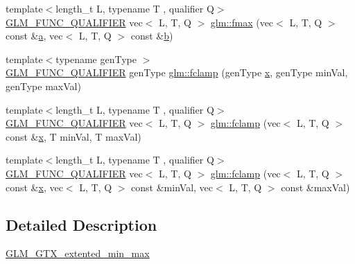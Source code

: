 \begin{DoxyCompactItemize}
\item 
{\footnotesize template$<$length\+\_\+t L, typename T , qualifier Q$>$ }\\\hyperlink{setup_8hpp_a33fdea6f91c5f834105f7415e2a64407}{G\+L\+M\+\_\+\+F\+U\+N\+C\+\_\+\+Q\+U\+A\+L\+I\+F\+I\+ER} vec$<$ L, T, Q $>$ \hyperlink{group__gtx__extended__min__max_ga538c9e7de1d0cb8157e548691487d32a}{glm\+::fmax} (vec$<$ L, T, Q $>$ const \&\hyperlink{_s_d_l__opengl__glext_8h_a3309789fc188587d666cda5ece79cf82}{a}, vec$<$ L, T, Q $>$ const \&\hyperlink{_s_d_l__opengl__glext_8h_a0f71581a41fd2264c8944126dabbd010}{b})
\item 
{\footnotesize template$<$typename gen\+Type $>$ }\\\hyperlink{setup_8hpp_a33fdea6f91c5f834105f7415e2a64407}{G\+L\+M\+\_\+\+F\+U\+N\+C\+\_\+\+Q\+U\+A\+L\+I\+F\+I\+ER} gen\+Type \hyperlink{group__gtx__extended__min__max_ga1e28539d3a46965ed9ef92ec7cb3b18a}{glm\+::fclamp} (gen\+Type \hyperlink{_s_d_l__opengl_8h_ad0e63d0edcdbd3d79554076bf309fd47}{x}, gen\+Type min\+Val, gen\+Type max\+Val)
\item 
{\footnotesize template$<$length\+\_\+t L, typename T , qualifier Q$>$ }\\\hyperlink{setup_8hpp_a33fdea6f91c5f834105f7415e2a64407}{G\+L\+M\+\_\+\+F\+U\+N\+C\+\_\+\+Q\+U\+A\+L\+I\+F\+I\+ER} vec$<$ L, T, Q $>$ \hyperlink{group__gtx__extended__min__max_ga60796d08903489ee185373593bc16b9d}{glm\+::fclamp} (vec$<$ L, T, Q $>$ const \&\hyperlink{_s_d_l__opengl_8h_ad0e63d0edcdbd3d79554076bf309fd47}{x}, T min\+Val, T max\+Val)
\item 
{\footnotesize template$<$length\+\_\+t L, typename T , qualifier Q$>$ }\\\hyperlink{setup_8hpp_a33fdea6f91c5f834105f7415e2a64407}{G\+L\+M\+\_\+\+F\+U\+N\+C\+\_\+\+Q\+U\+A\+L\+I\+F\+I\+ER} vec$<$ L, T, Q $>$ \hyperlink{group__gtx__extended__min__max_ga5c15fa4709763c269c86c0b8b3aa2297}{glm\+::fclamp} (vec$<$ L, T, Q $>$ const \&\hyperlink{_s_d_l__opengl_8h_ad0e63d0edcdbd3d79554076bf309fd47}{x}, vec$<$ L, T, Q $>$ const \&min\+Val, vec$<$ L, T, Q $>$ const \&max\+Val)
\end{DoxyCompactItemize}


\subsection{Detailed Description}
\hyperlink{group__gtx__extended__min__max}{G\+L\+M\+\_\+\+G\+T\+X\+\_\+extented\+\_\+min\+\_\+max} 